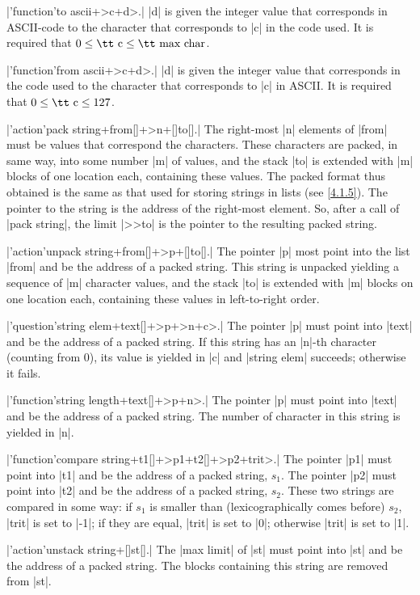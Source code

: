 \documentclass{article}
\newcommand\g[1]{{\sf #1}}
\begin{document}
\X\pp|'function'to ascii+>c+d>.|\Y
\pp|d| is given the integer value that corresponds in ASCII-code to the
character that corresponds to \pp|c| in the code used. It is required that
$0\le\mbox{\tt c}\le\mbox{\tt max char}$.

\X\pp|'function'from ascii+>c+d>.|\Y
\pp|d| is given the integer value that corresponds in the code used to the
character that corresponds to \pp|c| in ASCII. It is required that
$0\le\mbox{\tt c}\le 127$.

\X\pp|'action'pack string+from[]+>n+[]to[].|\Y
The right-most \pp|n| elements of \pp|from| must be values that correspond
the characters. These characters are packed, in same way, into some number
\pp|m| of values, and the stack \pp|to| is extended with \pp|m| blocks of
one location each, containing these values. The packed format thus obtained
is the same as that used for storing \g{string}s in lists (see \ref{4.1.5}).
The pointer to the string is the address of the right-most element. So,
after a call of \pp|pack string|, the \g{limit} \pp|>>to| is the pointer to
the resulting packed string.

\X\pp|'action'unpack string+from[]+>p+[]to[].|\Y
The pointer \pp|p| most point into the list \pp|from| and be the address of
a packed string. This string is unpacked yielding a sequence of \pp|m|
character values, and the stack \pp|to| is extended with \pp|m| blocks on
one location each, containing these values in left-to-right order.

\X\pp|'question'string elem+text[]+>p+>n+c>.|\Y
The pointer \pp|p| must point into \pp|text| and be the address of a packed
string. If this string has an \pp|n|-th character (counting from 0), its
value is yielded in \pp|c| and \pp|string elem| succeeds; otherwise it
fails.

\X\pp|'function'string length+text[]+>p+n>.|\Y
The pointer \pp|p| must point into \pp|text| and be the address of a packed
string. The number of character in this string is yielded in \pp|n|.

\X\pp|'function'compare string+t1[]+>p1+t2[]+>p2+trit>.|\Y
The pointer \pp|p1| must point into \pp|t1| and be the address of a packed
string, $s_1$. The pointer \pp|p2| must point into \pp|t2| and be the
address of a packed string, $s_2$. These two strings are compared in some
way: if $s_1$ is smaller than (lexicographically comes before) $s_2$, \pp|trit| is
set to \pp|-1|; if they are equal, \pp|trit| is set to \pp|0|; otherwise
\pp|trit| is set to \pp|1|.

\X\pp|'action'unstack string+[]st[].|\Y
The \pp|max limit| of \pp|st| must point into \pp|st| and be the address of
a packed string. The blocks containing this string are removed from \pp|st|.
\end{document}
